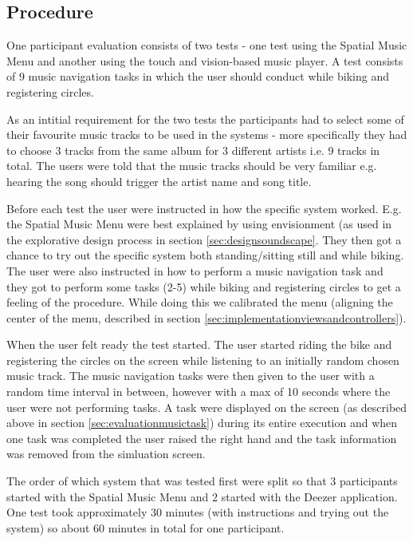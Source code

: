 \subsection{Procedure}
One participant evaluation consists of two tests - one test using the Spatial Music Menu and another using the touch and vision-based music player. A test consists of 9 music navigation tasks in which the user should conduct while biking and registering circles.

As an intitial requirement for the two tests the participants had to select some of their favourite music tracks to be used in the systems - more specifically they had to choose 3 tracks from the same album for 3 different artists i.e. 9 tracks in total. The users were told that the music tracks should be very familiar e.g. hearing the song should trigger the artist name and song title.

Before each test the user were instructed in how the specific system worked. E.g. the Spatial Music Menu were best explained by using envisionment (as used in the explorative design process in section \ref{sec:designsoundscape}. They then got a chance to try out the specific system both standing/sitting still and while biking. The user were also instructed in how to perform a music navigation task and they got to perform some tasks (2-5) while biking and registering circles to get a feeling of the procedure. While doing this we calibrated the menu (aligning the center of the menu, described in section \ref{sec:implementationviewsandcontrollers}).

When the user felt ready the test started. The user started riding the bike and registering the circles on the screen while listening to an initially random chosen music track. The music navigation tasks were then given to the user with a random time interval in between, however with a max of 10 seconds where the user were not performing tasks. A task were displayed on the screen (as described above in section \ref{sec:evaluationmusictask}) during its entire execution and when one task was completed the user raised the right hand and the task information was removed from the simluation screen.

The order of which system that was tested first were split so that 3 participants started with the Spatial Music Menu and 2 started with the Deezer application. One test took approximately 30 minutes (with instructions and trying out the system) so about 60 minutes in total for one participant.

